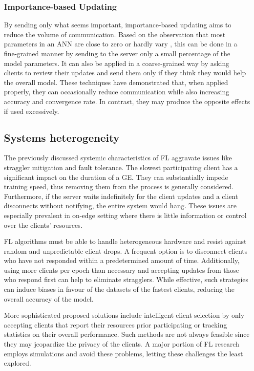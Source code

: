\subsubsection{Importance-based Updating}
By sending only what seems important, importance-based updating aims to reduce the volume of communication. Based on the observation that most parameters in an ANN are close to zero or hardly vary \cite{observation_parameters}, this can be done in a fine-grained manner by sending to the server only a small percentage of the model parameters. It can also be applied in a coarse-grained way by asking clients to review their updates and send them only if they think they would help the overall model. These techniques have demonstrated that, when applied properly, they can occasionally reduce communication while also increasing accuracy and convergence rate. In contrast, they may produce the opposite effects if used excessively.

\subsection{Systems heterogeneity}
The previously discussed systemic characteristics of FL aggravate issues like straggler mitigation and fault tolerance. The slowest participating client has a significant impact on the duration of a GE. They can substantially impede training speed, thus removing them from the process is generally considered. Furthermore, if the server waits indefinitely for the client updates and a client disconnects without notifying, the entire system would hang. These issues are especially prevalent in on-edge setting where there is little information or control over the clients' resources.

FL algorithms must be able to handle heterogeneous hardware and resist against random and unpredictable client drops. A frequent option is to disconnect clients who have not responded within a predetermined amount of time. Additionally, using more clients per epoch than necessary and accepting updates from those who respond first can help to eliminate stragglers. While effective, such strategies can induce biases in favour of the datasets of the fastest clients, reducing the overall accuracy of the model.

More sophisticated proposed solutions include intelligent client selection by only accepting clients that report their resources prior participating or tracking statistics on their overall performance. Such methods are not always feasible since they may jeopardize the privacy of the clients. A major portion of FL research employs simulations and avoid these problems, letting these challenges the least explored.

